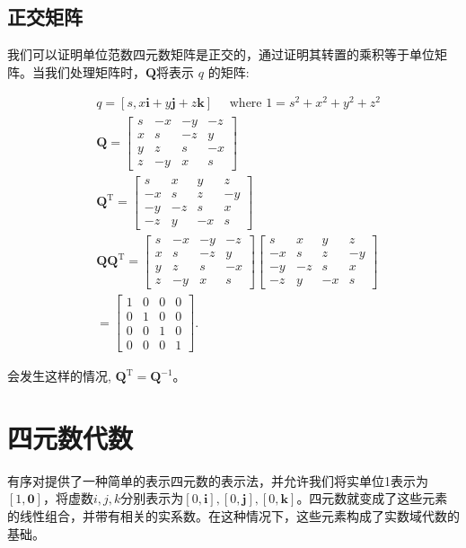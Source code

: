 \subsection{正交矩阵}
我们可以证明单位范数四元数矩阵是正交的，通过证明其转置的乘积等于单位矩阵。当我们处理矩阵时，$\mathbf{Q}$将表示 $ q $ 的矩阵:

$$
\begin{aligned}
& q=[s, x \mathbf{i}+y \mathbf{j}+z \mathbf{k}] \quad \text { where } 1=s^{2}+x^{2}+y^{2}+z^{2} \\
& \mathbf{Q}=\left[\begin{array}{cccc}s & -x & -y & -z \\x & s & -z & y \\y & z & s & -x \\z & -y & x & s\end{array}\right] \\
& \mathbf{Q}^{\mathrm{T}}=\left[\begin{array}{cccc}s & x & y & z \\-x & s & z & -y \\-y & -z & s & x \\-z & y & -x & s\end{array}\right] \\
& \mathbf{Q} \mathbf{Q}^{\mathrm{T}}=\left[\begin{array}{cccc}s & -x & -y & -z \\x & s & -z & y \\y & z & s & -x \\z & -y & x & s\end{array}\right]\left[\begin{array}{cccc}s & x & y & z \\-x & s & z & -y \\-y & -z & s & x \\-z & y & -x & s\end{array}\right] \\
& =\left[\begin{array}{llll}1 & 0 & 0 & 0 \\0 & 1 & 0 & 0 \\0 & 0 & 1 & 0 \\0 & 0 & 0 & 1\end{array}\right] \text {. }
\end{aligned}
$$

会发生这样的情况, $\mathbf{Q}^{\mathrm{T}}=\mathbf{Q}^{-1}$。

\section{四元数代数}
有序对提供了一种简单的表示四元数的表示法，并允许我们将实单位1表示为$[1,\mathbf{0}]$，将虚数$i, j, k$分别表示为$[0, \mathbf{i}],[0, \mathbf{j}],[0, \mathbf{k}]$。四元数就变成了这些元素的线性组合，并带有相关的实系数。在这种情况下，这些元素构成了实数域代数的基础。

